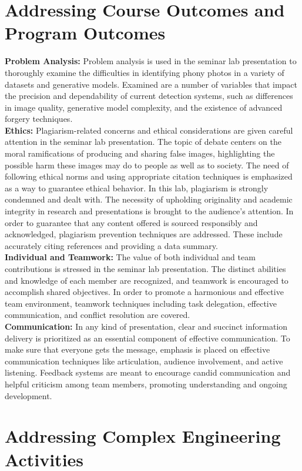 \documentclass[a4paper,14pt]{report}
\begin{document}
\chapter{Addressing Course Outcomes and Program Outcomes}
\textbf{Problem Analysis:}
Problem analysis is used in the seminar lab presentation to thoroughly examine the difficulties in identifying phony photos in a variety of datasets and generative models. Examined are a number of variables that impact the precision and dependability of current detection systems, such as differences in image quality, generative model complexity, and the existence of advanced forgery techniques.\\
\textbf{Ethics:}
Plagiarism-related concerns and ethical considerations are given careful attention in the seminar lab presentation. The topic of debate centers on the moral ramifications of producing and sharing false images, highlighting the possible harm these images may do to people as well as to society. The need of following ethical norms and using appropriate citation techniques is emphasized as a way to guarantee ethical behavior. In this lab, plagiarism is strongly condemned and dealt with. The necessity of upholding originality and academic integrity in research and presentations is brought to the audience's attention. In order to guarantee that any content offered is sourced responsibly and acknowledged, plagiarism prevention techniques are addressed. These include accurately citing references and providing a data summary. \\
\textbf{Individual and Teamwork:}
The value of both individual and team contributions is stressed in the seminar lab presentation. The distinct abilities and knowledge of each member are recognized, and teamwork is encouraged to accomplish shared objectives. In order to promote a harmonious and effective team environment, teamwork techniques including task delegation, effective communication, and conflict resolution are covered.\\
\textbf{Communication:}
In any kind of presentation, clear and succinct information delivery is prioritized as an essential component of effective communication. To make sure that everyone gets the message, emphasis is placed on effective communication techniques like articulation, audience involvement, and active listening. Feedback systems are meant to encourage candid communication and helpful criticism among team members, promoting understanding and ongoing development.

\chapter{Addressing Complex Engineering Activities}
\end{document}
